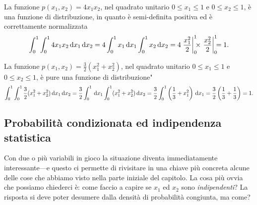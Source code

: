 \begin{examplebox}
  \begin{example}\label{exp:variabili_indipendenti_pdf}
    La funzione $p(x_1, x_2) = 4x_1x_2$, nel quadrato unitario
    $0 \leq x_1 \leq 1$ e $0 \leq x_2 \leq 1$, è una funzione di distribuzione,
    in quanto è semi-definita positiva ed è correttamente normalizzata
    \begin{align*}
      \int_0^1 \int_0^1 4x_1x_2 \diff[x_1]\diff[x_2] =
      4 \int_0^1 x_1\diff[x_1] \int_0^1 x_2\diff[x_2] =
      4 \eval{\frac{x_1^2}{2}}{0}{1} \times
      \eval{\frac{x_2^2}{2}}{0}{1} = 1.
    \end{align*}
  \end{example}

  \begin{example}\label{exp:variabili_dipendenti_pdf}
      La funzione $p(x_1, x_2) = \frac{3}{2}(x_1^2 + x_2^2)$, nel quadrato
      unitario $0 \leq x_1 \leq 1$ e $0 \leq x_2 \leq 1$, è pure una funzione
      di distribuzione"
      \begin{align*}
        \int_0^1 \int_0^1 \frac{3}{2}(x_1^2 + x_2^2) \diff[x_1]\diff[x_2] =
        \frac{3}{2} \int_0^1 \diff[x_1] \int_0^1 (x_1^2 + x_2^2) \diff[x_2] =
        \frac{3}{2} \int_0^1 \left( \frac{1}{3} + x_1^2 \right)\diff[x_1] =
        \frac{3}{2} \left( \frac{1}{3} + \frac{1}{3} \right)= 1.
      \end{align*}
  \end{example}
\end{examplebox}



\subsection{Probabilità condizionata ed indipendenza statistica}

Con due o più variabili in gioco la situazione diventa immediatamente
interessante---e questo ci permette di rivisitare in una chiave più concreta
alcune delle cose che abbiamo visto nella parte iniziale del capitolo.
La cosa più ovvia che possiamo chiederci è: come faccio a capire se $x_1$
ed $x_2$ sono \emph{indipendenti}? La risposta si deve poter desumere dalla
densità di probabilità congiunta, ma come?

